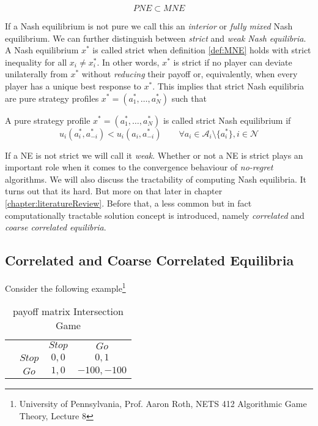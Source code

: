 \begin{equation*}
    PNE \subset MNE
\end{equation*}

If a Nash equilibrium is not pure we call this an \textit{interior} or \textit{fully mixed} Nash equilibrium. We can further distinguish between \textit{strict} and \textit{weak Nash equilibria}. A Nash equilibrium $x^*$ is called strict when definition \ref{def:MNE} holds with strict inequality for all $x_i \neq x_{i}^{*}$. In other words, $x^*$ is strict if no player can deviate unilaterally from $x^*$ without \textit{reducing} their payoff or, equivalently, when every player has a unique best response to $x^*$. This implies that strict Nash equilibria are pure strategy profiles $x^* = (a_{1}^{*},\dots,a_{N}^{*})$ such that

\begin{definition}\label{def:strictNE}
    A pure strategy profile $x^* = (a_{1}^{*},\dots,a_{N}^{*})$ is called strict Nash equilibrium if
    \[u_i(a_{i}^{*},a_{-i}^{*}) < u_i(a_{i},a_{-i}^{*}) \qquad \forall a_i \in \mathcal{A}_i \setminus \{a_{i}^{*}\} , i \in \mathcal{N}\]
\end{definition}

If a NE is not strict we will call it \textit{weak}. Whether or not a NE is strict plays an important role when it comes to the convergence behaviour of \textit{no-regret} algorithms. We will also discuss the tractability of computing Nash equilibria. It turns out that its hard. But more on that later in chapter \ref{chapter:literatureReview}. Before that, a less common but in fact computationally tractable solution concept is introduced, namely \textit{correlated} and \textit{coarse correlated equilibria}.\\

\subsection{Correlated and Coarse Correlated Equilibria}\label{subsection:CEandCCE}

Consider the following example\footnote{University of Pennsylvania, Prof. Aaron Roth, NETS 412 Algorithmic Game Theory, Lecture 8}

\begin{table}[H]\centering
\setlength{\extrarowheight}{2pt}
\begin{tabular}{cc|c|c|}
  & \multicolumn{1}{c}{} & \multicolumn{1}{c}{$Stop$}  & \multicolumn{1}{c}{$Go$} \\\cline{3-4}
  & $Stop$ & $0,0$ & $0,1$ \\\cline{3-4}
  & $Go$ & $1,0$ & $-100,-100$ \\\cline{3-4}
\end{tabular}\caption{\label{tab:payoffIntersectionfromFiniteGames}payoff matrix Intersection Game}
\end{table}

